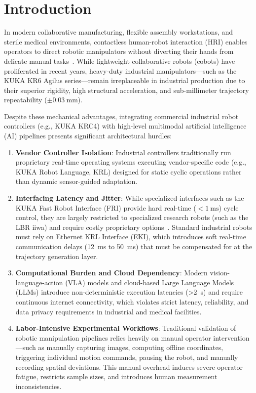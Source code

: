 \documentclass[runningheads]{llncs}
\begin{document}
\section{Introduction}
\label{sec:introduction}

In modern collaborative manufacturing, flexible assembly workstations, and sterile medical environments, contactless human-robot interaction (HRI) enables operators to direct robotic manipulators without diverting their hands from delicate manual tasks~\cite{quirubot2016,schafer2023smart}. While lightweight collaborative robots (cobots) have proliferated in recent years, heavy-duty industrial manipulators—such as the KUKA KR6 Agilus series—remain irreplaceable in industrial production due to their superior rigidity, high structural acceleration, and sub-millimeter trajectory repeatability ($\pm\SI{0.03}{\milli\meter}$).

Despite these mechanical advantages, integrating commercial industrial robot controllers (e.g., KUKA KRC4) with high-level multimodal artificial intelligence (AI) pipelines presents significant architectural hurdles:
\begin{enumerate}
    \item \textbf{Vendor Controller Isolation}: Industrial controllers traditionally run proprietary real-time operating systems executing vendor-specific code (e.g., KUKA Robot Language, KRL) designed for static cyclic operations rather than dynamic sensor-guided adaptation.
    \item \textbf{Interfacing Latency and Jitter}: While specialized interfaces such as the KUKA Fast Robot Interface (FRI) provide hard real-time ($<\SI{1}{\milli\second}$) cycle control, they are largely restricted to specialized research robots (such as the LBR iiwa) and require costly proprietary options~\cite{lbr_stack2024,kuka_eki_eval2022}. Standard industrial robots must rely on Ethernet KRL Interface (EKI), which introduces soft real-time communication delays (\SI{12}{\milli\second} to \SI{50}{\milli\second}) that must be compensated for at the trajectory generation layer.
    \item \textbf{Computational Burden and Cloud Dependency}: Modern vision-language-action (VLA) models and cloud-based Large Language Models (LLMs) introduce non-deterministic execution latencies (\SI{>2}{\second}) and require continuous internet connectivity, which violates strict latency, reliability, and data privacy requirements in industrial and medical facilities.
    \item \textbf{Labor-Intensive Experimental Workflows}: Traditional validation of robotic manipulation pipelines relies heavily on manual operator intervention—such as manually capturing images, computing offline coordinates, triggering individual motion commands, pausing the robot, and manually recording spatial deviations. This manual overhead induces severe operator fatigue, restricts sample sizes, and introduces human measurement inconsistencies.
\end{enumerate}
\end{document}
